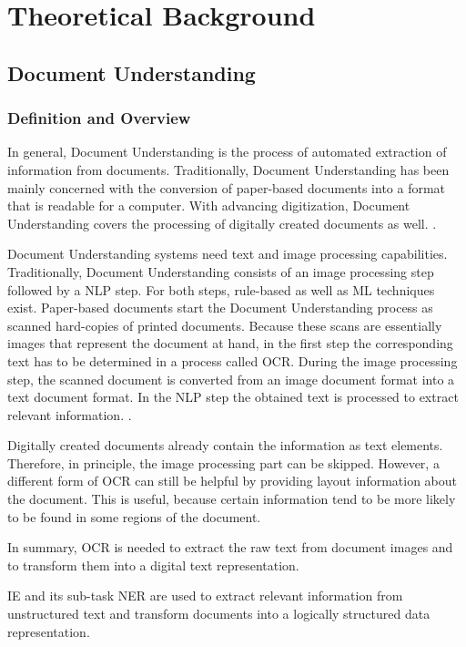 \chapter{Theoretical Background}

\section{Document Understanding}
\subsection{Definition and Overview}
In general, Document Understanding is the process of automated extraction of information from documents.
Traditionally, Document Understanding has been mainly concerned with the conversion of paper-based documents into a format that is readable for a computer.
With advancing digitization, Document Understanding covers the processing of digitally created documents as well. \cite{taylor1994integrated,aiello2002document}. 

Document Understanding systems need text and image processing capabilities.
Traditionally, Document Understanding consists of an image processing step followed by a \acf{NLP} step. For both steps, rule-based as well as \acf{ML} techniques exist. Paper-based documents start the Document Understanding process as scanned hard-copies of printed documents. Because these scans are essentially images that represent the document at hand, in the first step the corresponding text has to be determined in a process called \acf{OCR}. During the image processing step, the scanned document is converted from an image document format into a text document format. In the \ac{NLP} step the obtained text is processed to extract relevant information. \cite{taylor1994integrated}. 

Digitally created documents already contain the information as text elements. Therefore, in principle, the image processing part can be skipped. However, a different form of \ac{OCR} can still be helpful by providing layout information about the document. This is useful, because certain information tend to be more likely to be found in some regions of the document. \cite{wang2023docllm}

In summary, \ac{OCR} is needed to extract the raw text from document images and to transform them into a digital text representation.

\acf{IE} and its sub-task \acf{NER} are used to extract relevant information from unstructured text and transform documents into a logically structured data representation.

